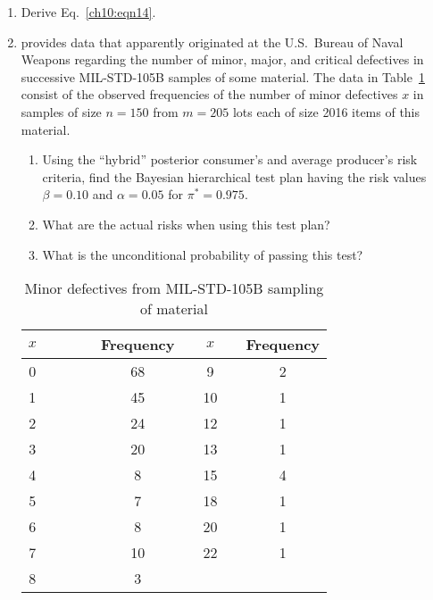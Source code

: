\documentclass {book}
\begin{document}
\begin{enumerate}[\ref{ch10}.1]
\item Derive Eq.~\ref{ch10:eqn14}.

\item \label{ch10:hw4} \citet{B62} provides data that apparently
originated at the U.S.\ Bureau of Naval Weapons regarding the
number of minor, major, and critical defectives in successive
MIL-STD-105B samples of some material. The data in
Table~\ref{ch10:tab9} consist of the observed frequencies of the
number of minor defectives $x$ in samples of size $n = 150$ from
$m = 205$ lots each of size 2016 items of this material.
\begin{enumerate} \item Using the ``hybrid'' posterior consumer's and average
producer's risk criteria, find the Bayesian hierarchical test plan
having the risk values $\beta = 0.10$ and $\alpha = 0.05$ for
$\pi^* = 0.975$. \item What are the actual risks when using this
test plan? \item What is the unconditional probability of passing
this test?\end{enumerate} 


\begin{table}
\caption{Minor defectives from MIL-STD-105B sampling of material
\citep{B62}}\label{ch10:tab9}
 \centering
\begin{tabular}{cccc|ccc}
\hline
$x$ & \mbox{} & Frequency & \mbox{} & $x$ & \mbox{} & Frequency\\
\hline%
0 & \mbox{} & 68 & \mbox{} & \hspace{0.05in}9  & \mbox{} & 2\\
1 & \mbox{} & 45 & \mbox{} & 10 & \mbox{} & 1\\
2 & \mbox{} & 24 & \mbox{} & 12 & \mbox{} & 1\\
3 & \mbox{} & 20 & \mbox{} & 13 & \mbox{} & 1\\
4 & \mbox{} & \hspace{0.05in}8  & \mbox{} & 15 & \mbox{} & 4\\
5 & \mbox{} & \hspace{0.05in}7  & \mbox{} & 18 & \mbox{} & 1\\
6 & \mbox{} & \hspace{0.05in}8  & \mbox{} & 20 & \mbox{} & 1\\
7 & \mbox{} & 10 & \mbox{} & 22 & \mbox{} & 1\\
8 & \mbox{}\ \ \ \ \  & \hspace{0.05in}3  & \mbox{} &  & \mbox{} & \\
\hline
\end{tabular}
\end{table}



\end{enumerate}
\end{document}
